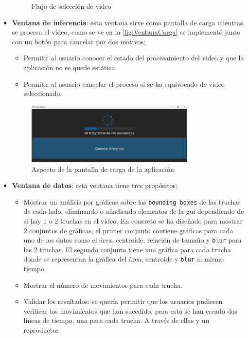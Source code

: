 \begin{itemize}
\begin{figure}[H]
\begin{subfigure}{0.8\textwidth}
        \end{subfigure}
        \caption{Flujo de selección de video}
        \label{fig:InicialSeleccion}
    \end{figure}
    \clearpage
    \item \textbf{Ventana de inferencia}: esta ventana sirve como pantalla de carga mientras se procesa el video, como se ve en la \autoref{fig:VentanaCarga} se implementó junto con un botón para cancelar por dos motivos:
    \begin{itemize}
        \item Permitir al usuario conocer el estado del procesamiento del video y que la aplicación no se quede estática.
        \item Permitir al usuario cancelar el proceso si se ha equivocado de video seleccionado.
    \end{itemize}
    \begin{figure}[H]
        \centering
        \includegraphics[width=0.8\textwidth]{images/6/6.5/Carga.png}
        \caption{Aspecto de la pantalla de carga de la aplicación}
        \label{fig:VentanaCarga}
    \end{figure}
\clearpage
    \item \textbf{Ventana de datos}: esta ventana tiene tres propósitos:
    \begin{itemize}
        \item Mostrar un análisis por gráficas sobre las \texttt{bounding boxes} de las truchas de cada lado, eliminando o añadiendo elementos de la \acrshort{gui} dependiendo de sí hay 1 o 2 truchas en el video. En concreto se 
        ha diseñado para mostrar 2 conjuntos de gráficas, el primer conjunto contiene gráficas para cada uno de los datos como el área, centroide, relación de tamaño y \texttt{blur} para las 2 truchas. El segundo conjunto tiene 
        una gráfica para cada trucha donde se representan la gráfica del área, centroide y \texttt{blur} al mismo tiempo.
        \item Mostrar el número de movimientos para cada trucha.
        \item Validar los resultados: se quería permitir que los usuarios pudiesen verificar los movimientos que han sucedido, para esto se han creado dos líneas de tiempo, una para cada trucha. A través de ellas y un reproductor 

\end{itemize}
\end{itemize}
